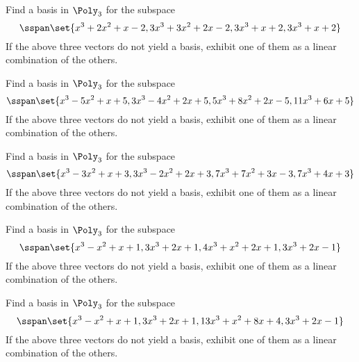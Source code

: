 \begin{ex} Find a basis in $\Poly_{3}$ for the subspace
\begin{equation*}
\sspan\set{
x^{3}+2x^{2}+x-2,3x^{3}+3x^{2}+2x-2,3x^{3}+x+2,3x^{3}+x+2}
\end{equation*}
If the above three vectors do not yield a basis, exhibit one of them as a
linear combination of the others.
\end{ex}

\begin{ex} Find a basis in $\Poly_{3}$ for the subspace
\begin{equation*}
\sspan\set{
x^{3}-5x^{2}+x+5,3x^{3}-4x^{2}+2x+5,5x^{3}+8x^{2}+2x-5,11x^{3}+6x+5}
\end{equation*}
If the above three vectors do not yield a basis, exhibit one of them as a
linear combination of the others.
\end{ex}

\begin{ex} Find a basis in $\Poly_{3}$ for the subspace
\begin{equation*}
\sspan\set{
x^{3}-3x^{2}+x+3,3x^{3}-2x^{2}+2x+3,7x^{3}+7x^{2}+3x-3,7x^{3}+4x+3}
\end{equation*}
If the above three vectors do not yield a basis, exhibit one
of them as a linear combination of the others.
\end{ex}

\begin{ex} Find a basis in $\Poly_{3}$ for the subspace
\begin{equation*}
\sspan\set{
x^{3}-x^{2}+x+1,3x^{3}+2x+1,4x^{3}+x^{2}+2x+1,3x^{3}+2x-1}
\end{equation*}
If the above three vectors do not yield a basis, exhibit one
of them as a linear combination of the others.
\end{ex}

\begin{ex} Find a basis in $\Poly_{3}$ for the subspace
\begin{equation*}
\sspan\set{
x^{3}-x^{2}+x+1,3x^{3}+2x+1,13x^{3}+x^{2}+8x+4,3x^{3}+2x-1}
\end{equation*}
If the above three vectors do not yield a basis, exhibit one
of them as a linear combination of the others.
\end{ex}

